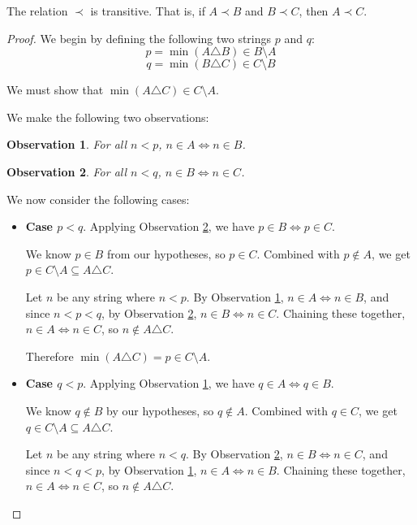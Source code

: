 \documentclass{svproc}
\newtheorem{observation}{Observation}
\begin{document}
\begin{theorem}
The relation $\prec$ is transitive. That is, if $A \prec B$ and $B \prec C$, then $A \prec C$.
\end{theorem}
\begin{proof}
We begin by defining the following two strings $p$ and $q$:
\[
  p = \min(A \triangle B) \in B \setminus A
\]
\[
  q = \min(B \triangle C) \in C \setminus B
\]

\noindent We must show that $\min(A \triangle C) \in C \setminus A$.

\medskip

\noindent We make the following two observations:
\begin{observation}\label{obs:1}
For all $n < p$, $n \in A \iff n \in B$.
\end{observation}
\begin{observation}\label{obs:2}
For all $n < q$, $n \in B \iff n \in C$.
\end{observation}

\noindent We now consider the following cases:
\begin{itemize}
  \item \textbf{Case $p < q$}. Applying Observation \ref{obs:2}, we have $p \in B \iff p \in C$.
  
  \medskip

  We know $p \in B$ from our hypotheses, so $p \in C$. Combined with $p \notin A$, we get $p \in C \setminus A \subseteq A \triangle C$.

  \medskip

  Let $n$ be any string where $n < p$. By Observation \ref{obs:1}, $n \in A \iff n \in B$, and since $n < p < q$, by Observation \ref{obs:2}, $n \in B \iff n \in C$. Chaining these together, $n \in A \iff n \in C$, so $n \notin A \triangle C$.

  \medskip

  Therefore $\min(A \triangle C) = p \in C \setminus A$.

  \item \textbf{Case $q < p$}. Applying Observation \ref{obs:1}, we have $q \in A \iff q \in B$.
  
  \medskip

  We know $q \notin B$ by our hypotheses, so $q \notin A$. Combined with $q \in C$, we get $q \in C \setminus A \subseteq A \triangle C$.

  \medskip

  Let $n$ be any string where $n < q$. By Observation \ref{obs:2}, $n \in B \iff n \in C$, and since $n < q < p$, by Observation \ref{obs:1}, $n \in A \iff n \in B$. Chaining these together, $n \in A \iff n \in C$, so $n \notin A \triangle C$.


\end{itemize}
\end{proof}
\end{document}
